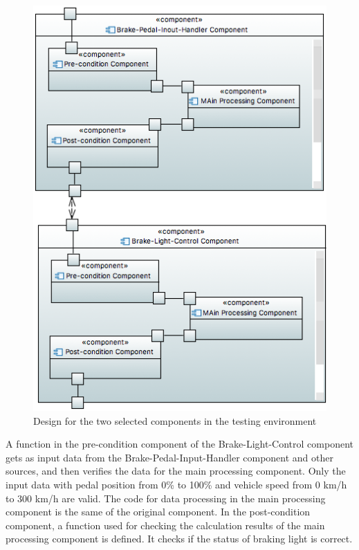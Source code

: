 \begin{figure}[htb]
\centering
\includegraphics[width=0.9\linewidth]{figure/component33.png}
\caption{Design for the two selected components in the testing environment}
\label{sec:testingEnvironment}
\end{figure}


A function in the pre-condition component of the Brake-Light-Control component gets as input data from the Brake-Pedal-Input-Handler component and other sources, and then verifies the data for the main processing component. Only the input data with pedal position from 0\% to 100\% and vehicle speed from 0 km/h to 300 km/h are valid. The code for data processing in the main processing component is the same of the original component. In the post-condition component, a function used for checking the calculation results of the main processing component is defined. It checks if the status of braking light is correct.



